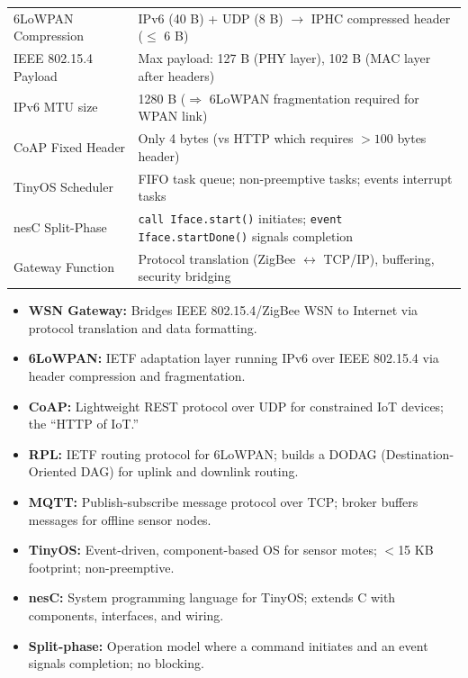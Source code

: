 \documentclass[12pt,a4paper]{article}
\renewcommand{\arraystretch}{1.45}
\begin{document}
\begin{tcolorbox}[formulabox, title={\textbf{Key Concepts at a Glance}}]
\renewcommand{\arraystretch}{1.35}
\begin{tabularx}{\linewidth}{B{5.0cm} X}
6LoWPAN Compression & IPv6 (40 B) + UDP (8 B) $\rightarrow$ IPHC compressed header ($\leq$ 6 B) \\[4pt]
IEEE 802.15.4 Payload & Max payload: 127 B (PHY layer), 102 B (MAC layer after headers) \\[4pt]
IPv6 MTU size & 1280 B \quad ($\Rightarrow$ 6LoWPAN fragmentation required for WPAN link) \\[4pt]
CoAP Fixed Header & Only 4 bytes \quad (vs HTTP which requires $>100$ bytes header) \\[4pt]
TinyOS Scheduler & FIFO task queue; non-preemptive tasks; events interrupt tasks \\[4pt]
nesC Split-Phase & \texttt{call Iface.start()} initiates; \texttt{event Iface.startDone()} signals completion \\[4pt]
Gateway Function & Protocol translation (ZigBee $\leftrightarrow$ TCP/IP), buffering, security bridging
\end{tabularx}
\end{tcolorbox}

\begin{tcolorbox}[defbox, title={\textbf{One-Line Definitions}}]
\begin{itemize}[leftmargin=*, itemsep=3pt]
  \item \textbf{WSN Gateway:} Bridges IEEE 802.15.4/ZigBee WSN to Internet via protocol translation and data formatting.
  \item \textbf{6LoWPAN:} IETF adaptation layer running IPv6 over IEEE 802.15.4 via header compression and fragmentation.
  \item \textbf{CoAP:} Lightweight REST protocol over UDP for constrained IoT devices; the ``HTTP of IoT.''
  \item \textbf{RPL:} IETF routing protocol for 6LoWPAN; builds a DODAG (Destination-Oriented DAG) for uplink and downlink routing.
  \item \textbf{MQTT:} Publish-subscribe message protocol over TCP; broker buffers messages for offline sensor nodes.
  \item \textbf{TinyOS:} Event-driven, component-based OS for sensor motes; $<$15 KB footprint; non-preemptive.
  \item \textbf{nesC:} System programming language for TinyOS; extends C with components, interfaces, and wiring.
  \item \textbf{Split-phase:} Operation model where a command initiates and an event signals completion; no blocking.
\end{itemize}
\end{tcolorbox}
\end{document}
